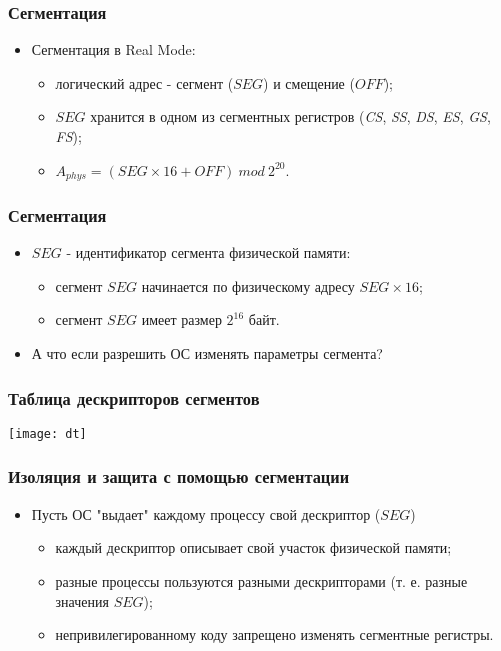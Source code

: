 \begin{frame}
\frametitle{Сегментация}
\begin{itemize}
    \item<1->Сегментация в Real Mode:
    \begin{itemize}
        \item<2->логический адрес - сегмент ($SEG$) и смещение ($OFF$);
        \item<2->$SEG$ хранится в одном из сегментных регистров (\emph{CS},
        \emph{SS}, \emph{DS}, \emph{ES}, \emph{GS}, \emph{FS});
        \item<3->$A_{phys} = \left(SEG\times 16 + OFF\right)~mod~2^{20}$.
    \end{itemize}
\end{itemize}
\end{frame}

\begin{frame}
\frametitle{Сегментация}
\begin{itemize}
    \item<1->$SEG$ - идентификатор сегмента физической памяти:
    \begin{itemize}
        \item<2->сегмент $SEG$ начинается по физическому адресу $SEG\times 16$;
        \item<3->сегмент $SEG$ имеет размер $2^{16}$ байт.
    \end{itemize}
    \item<4->А что если разрешить ОС изменять параметры сегмента?
\end{itemize}
\end{frame}

\begin{frame}
\frametitle{Таблица дескрипторов сегментов}
\texttt{[image: dt]}
\end{frame}

\begin{frame}
\frametitle{Изоляция и защита с помощью сегментации}
\begin{itemize}
    \item<1->Пусть ОС "выдает" каждому процессу свой дескриптор ($SEG$)
    \begin{itemize}
        \item<2->каждый дескриптор описывает свой участок физической памяти;
        \item<3->разные процессы пользуются разными дескрипторами (т. е. разные
        значения $SEG$);
        \item<4->непривилегированному коду запрещено изменять сегментные
        регистры.
    \end{itemize}
\end{itemize}
\end{frame}

